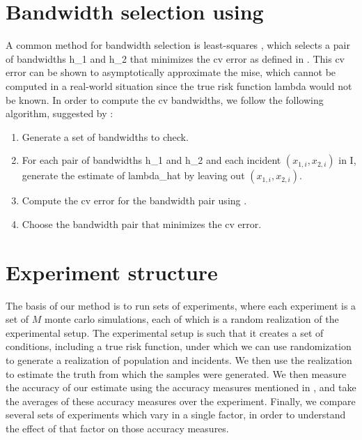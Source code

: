 \section{Bandwidth selection using }
\label{sec:method:cross-validation}

A common method for bandwidth selection is least-squares ,
which selects a pair of bandwidths \gls{h_1} and \gls{h_2} that minimizes the \gls{cv} error as defined in .
This \gls{cv} error can be shown to asymptotically approximate the \gls{mise},
which cannot be computed in a real-world situation since the true risk function \gls{lambda} would not be known.
In order to compute the \gls{cv} bandwidths,
we follow the following algorithm,
suggested by :
\begin{enumerate}
    \item Generate a set of bandwidths to check.
    \item For each pair of bandwidths \gls{h_1} and \gls{h_2} and each incident $(x_{1,i}, x_{2,i})$ in \gls{I}, generate the estimate of \gls{lambda_hat} by leaving out $(x_{1,i}, x_{2,i})$.
    \item Compute the \gls{cv} error for the bandwidth pair using .
    \item Choose the bandwidth pair that minimizes the \gls{cv} error.
\end{enumerate}


\section{Experiment structure}
\label{sec:method:experiment_structure}

The basis of our method is to run sets of experiments,
where each experiment is a set of $M$ monte carlo simulations,
each of which is a random realization of the experimental setup.
The experimental setup is such that it creates a set of conditions,
including a true risk function,
under which we can use randomization to generate a realization of population and incidents.
We then use the realization to estimate the truth from which the samples were generated.
We then measure the accuracy of our estimate using the accuracy measures mentioned in ,
and take the averages of these accuracy measures over the experiment.
Finally, we compare several sets of experiments which vary in a single factor,
in order to understand the effect of that factor on those accuracy measures.

